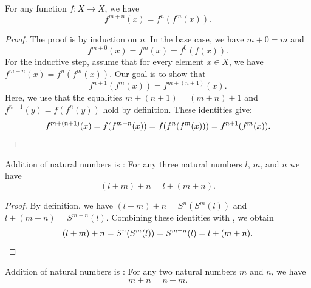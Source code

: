 \begin{proposition}\label{proposition:iterate-add}
  For any function $f:X\to X$, we have
  \begin{equation*}
    f^{m+n}(x)=f^n(f^m(x)).
  \end{equation*}
\end{proposition}

\begin{proof}
  The proof is by induction on $n$. In the base case, we have $m+0=m$ and
  \begin{equation*}
    f^{m+0}(x)=f^m(x)=f^0(f(x)).
  \end{equation*}
  For the inductive step, assume that for every element $x\in X$, we have $f^{m+n}(x)=f^n(f^m(x))$. Our goal is to show that
  \begin{equation*}
    f^{n+1}(f^m(x))=f^{m+(n+1)}(x).
  \end{equation*}
  Here, we use that the equalities $m+(n+1)=(m+n)+1$ and $f^{n+1}(y)=f(f^n(y))$ hold by definition. These identities give:
  \begin{equation*}
    f^{m+(n+1)}(x)=f(f^{m+n}(x))=f(f^n(f^m(x)))=f^{n+1}(f^m(x)). \qedhere
  \end{equation*}
\end{proof}

\begin{corollary}
  Addition of natural numbers is : For any three natural numbers $l$, $m$, and $n$ we have
  \begin{equation*}
    (l+m)+n = l+(m+n).
  \end{equation*}
\end{corollary}

\begin{proof}
  By definition, we have $(l+m)+n=S^n(S^m(l))$ and $l+(m+n)=S^{m+n}(l)$. Combining these identities with , we obtain
  \begin{equation*}
    (l+m)+n=S^n(S^m(l))=S^{m+n}(l)=l+(m+n).\qedhere
  \end{equation*}
\end{proof}

\begin{proposition}
  Addition of natural numbers is : For any two natural numbers $m$ and $n$, we have
  \begin{equation*}
    m+n=n+m.
  \end{equation*}
\end{proposition}

